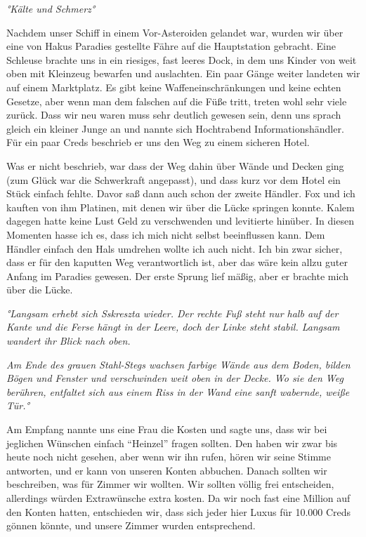 \documentclass[11pt]{scrartcl}
\begin{document}
\emph{°Kälte und Schmerz°}

Nachdem unser Schiff in einem Vor-Asteroiden gelandet war, wurden wir
über eine von Hakus Paradies gestellte Fähre auf die Hauptstation
gebracht. Eine Schleuse brachte uns in ein riesiges, fast leeres Dock,
in dem uns Kinder von weit oben mit Kleinzeug bewarfen und auslachten.
Ein paar Gänge weiter landeten wir auf einem Marktplatz. Es gibt keine
Waffeneinschränkungen und keine echten Gesetze, aber wenn man dem
falschen auf die Füße tritt, treten wohl sehr viele zurück. Dass wir neu
waren muss sehr deutlich gewesen sein, denn uns sprach gleich ein
kleiner Junge an und nannte sich Hochtrabend Informationshändler. Für
ein paar Creds beschrieb er uns den Weg zu einem sicheren Hotel.

Was er nicht beschrieb, war dass der Weg dahin über Wände und Decken
ging (zum Glück war die Schwerkraft angepasst), und dass kurz vor dem
Hotel ein Stück einfach fehlte. Davor saß dann auch schon der zweite
Händler. Fox und ich kauften von ihm Platinen, mit denen wir über die
Lücke springen konnte. Kalem dagegen hatte keine Lust Geld zu
verschwenden und levitierte hinüber. In diesen Momenten hasse ich es,
dass ich mich nicht selbst beeinflussen kann. Dem Händler einfach den
Hals umdrehen wollte ich auch nicht. Ich bin zwar sicher, dass er für
den kaputten Weg verantwortlich ist, aber das wäre kein allzu guter
Anfang im Paradies gewesen. Der erste Sprung lief mäßig, aber er brachte
mich über die Lücke.

\emph{°Langsam erhebt sich Sskreszta wieder. Der rechte Fuß steht nur
halb auf der Kante und die Ferse hängt in der Leere, doch der Linke
steht stabil. Langsam wandert ihr Blick nach oben.}

\emph{Am Ende des grauen Stahl-Stegs wachsen farbige Wände aus dem
Boden, bilden Bögen und Fenster und verschwinden weit oben in der Decke.
Wo sie den Weg berühren, entfaltet sich aus einem Riss in der Wand eine
sanft wabernde, weiße Tür.°}

Am Empfang nannte uns eine Frau die Kosten und sagte uns, dass wir bei
jeglichen Wünschen einfach ``Heinzel'' fragen sollten. Den haben wir
zwar bis heute noch nicht gesehen, aber wenn wir ihn rufen, hören wir
seine Stimme antworten, und er kann von unseren Konten abbuchen. Danach
sollten wir beschreiben, was für Zimmer wir wollten. Wir sollten völlig
frei entscheiden, allerdings würden Extrawünsche extra kosten. Da wir
noch fast eine Million auf den Konten hatten, entschieden wir, dass sich
jeder hier Luxus für 10.000 Creds gönnen könnte, und unsere Zimmer
wurden entsprechend.
\end{document}
